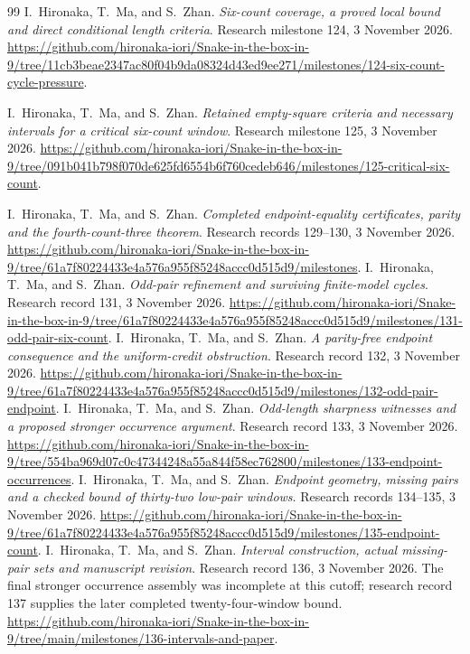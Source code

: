 \documentclass[11pt,a4paper]{article}
\theoremstyle{definition}
\theoremstyle{remark}
\begin{document}
\begin{thebibliography}{99}
I.~Hironaka, T.~Ma, and S.~Zhan. \emph{Six-count coverage, a proved local bound and direct conditional length criteria}. Research milestone 124, 3 November 2026.
\url{https://github.com/hironaka-iori/Snake-in-the-box-in-9/tree/11cb3beae2347ac80f04b9da08324d43ed9ee271/milestones/124-six-count-cycle-pressure}.

I.~Hironaka, T.~Ma, and S.~Zhan. \emph{Retained empty-square criteria and necessary intervals for a critical six-count window}. Research milestone 125, 3 November 2026.
\url{https://github.com/hironaka-iori/Snake-in-the-box-in-9/tree/091b041b798f070de625fd6554b6f760cedeb646/milestones/125-critical-six-count}.


I.~Hironaka, T.~Ma, and S.~Zhan. \emph{Completed endpoint-equality certificates, parity and the fourth-count-three theorem}. Research records 129--130, 3 November 2026.
\url{https://github.com/hironaka-iori/Snake-in-the-box-in-9/tree/61a7f80224433e4a576a955f85248accc0d515d9/milestones}.
I.~Hironaka, T.~Ma, and S.~Zhan. \emph{Odd-pair refinement and surviving finite-model cycles}. Research record 131, 3 November 2026.
\url{https://github.com/hironaka-iori/Snake-in-the-box-in-9/tree/61a7f80224433e4a576a955f85248accc0d515d9/milestones/131-odd-pair-six-count}.
I.~Hironaka, T.~Ma, and S.~Zhan. \emph{A parity-free endpoint consequence and the uniform-credit obstruction}. Research record 132, 3 November 2026.
\url{https://github.com/hironaka-iori/Snake-in-the-box-in-9/tree/61a7f80224433e4a576a955f85248accc0d515d9/milestones/132-odd-pair-endpoint}.
I.~Hironaka, T.~Ma, and S.~Zhan. \emph{Odd-length sharpness witnesses and a proposed stronger occurrence argument}. Research record 133, 3 November 2026.
\url{https://github.com/hironaka-iori/Snake-in-the-box-in-9/tree/554ba969d07c0c47344248a55a844f58ec762800/milestones/133-endpoint-occurrences}.
I.~Hironaka, T.~Ma, and S.~Zhan. \emph{Endpoint geometry, missing pairs and a checked bound of thirty-two low-pair windows}. Research records 134--135, 3 November 2026.
\url{https://github.com/hironaka-iori/Snake-in-the-box-in-9/tree/61a7f80224433e4a576a955f85248accc0d515d9/milestones/135-endpoint-count}.
I.~Hironaka, T.~Ma, and S.~Zhan. \emph{Interval construction, actual missing-pair sets and manuscript revision}. Research record 136, 3 November 2026. The final stronger occurrence assembly was incomplete at this cutoff; research record 137 supplies the later completed twenty-four-window bound.
\url{https://github.com/hironaka-iori/Snake-in-the-box-in-9/tree/main/milestones/136-intervals-and-paper}.


\end{thebibliography}
\end{document}
